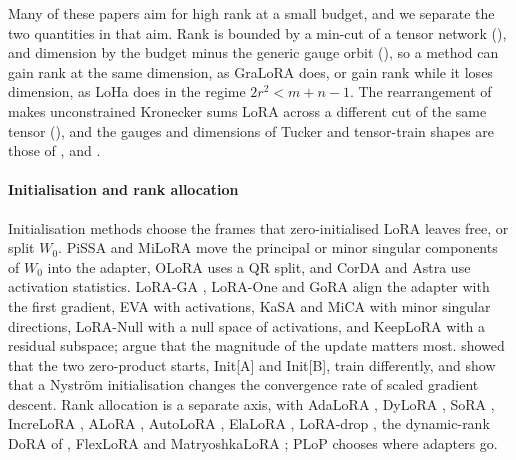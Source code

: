 Many of these papers aim for high rank at a small budget, and we separate the two quantities in that aim. Rank is bounded by a min-cut of a tensor network (), and dimension by the budget minus the generic gauge orbit (), so a method can gain rank at the same dimension, as GraLoRA does, or gain rank while it loses dimension, as LoHa does in the regime $2r^2<m+n-1$. The rearrangement of \citet{loan1993approximation} makes unconstrained Kronecker sums LoRA across a different cut of the same tensor (), and the gauges and dimensions of Tucker and tensor-train shapes are those of \citet{xkoch2010dynamical}, \citet{xuschmajew2013geometry} and \citet{xholtz2012manifolds}.

\paragraph{Initialisation and rank allocation}
Initialisation methods choose the frames that zero-initialised LoRA leaves free, or split $W_0$. PiSSA \citep{meng2024pissa} and MiLoRA \citep{wang2024milora} move the principal or minor singular components of $W_0$ into the adapter, OLoRA \citep{buyukakyuz2024olora} uses a QR split, and CorDA \citep{yang2024corda} and Astra \citep{liu2026astra} use activation statistics. LoRA-GA \citep{wang2024lorab}, LoRA-One \citep{zhang2025lorab} and GoRA \citep{he2025gora} align the adapter with the first gradient, EVA \citep{paischer2024parameter} with activations, KaSA \citep{wang2024kasa} and MiCA \citep{rudiger2026mica} with minor singular directions, LoRA-Null \citep{tang2025put} with a null space of activations, and KeepLoRA \citep{luo2026keeplora} with a residual subspace; \citet{zhang2025primacy} argue that the magnitude of the update matters most. \citet{hayou2024impact} showed that the two zero-product starts, Init[A] and Init[B], train differently, and \citet{li2024crucial} show that a Nyström initialisation changes the convergence rate of scaled gradient descent. Rank allocation is a separate axis, with AdaLoRA \citep{zhang2023adalora}, DyLoRA \citep{valipour2022dylora}, SoRA \citep{ding2023sparse}, IncreLoRA \citep{zhang2023increlora}, ALoRA \citep{liu2024alora}, AutoLoRA \citep{zhang2024autolora}, ElaLoRA \citep{chang2025elalora}, LoRA-drop \citep{zhou2024lora}, the dynamic-rank DoRA of \citet{mao2024dora}, FlexLoRA \citep{liu2026flexlora} and MatryoshkaLoRA \citep{modoranu2026matryoshkalora}; PLoP \citep{hayou2025plop} chooses where adapters go.


